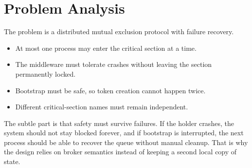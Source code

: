 \clearpage
\section{Problem Analysis}

The problem is a distributed mutual exclusion protocol with failure recovery.
\begin{itemize}
    \item At most one process may enter the critical section at a time.
    \item The middleware must tolerate crashes without leaving the section permanently locked.
    \item Bootstrap must be safe, so token creation cannot happen twice.
    \item Different critical-section names must remain independent.
\end{itemize}

The subtle part is that safety must survive failures. If the holder crashes,
the system should not stay blocked forever, and if bootstrap is interrupted,
the next process should be able to recover the queue without manual cleanup.
That is why the design relies on broker semantics instead of keeping a second
local copy of state.
